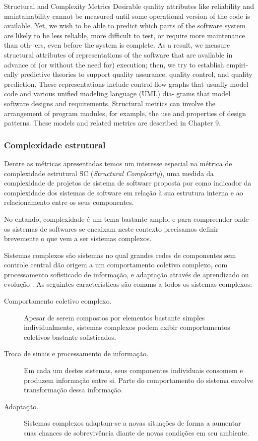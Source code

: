 Structural and Complexity Metrics
Desirable quality attributes like reliability and maintainability cannot be
measured until some operational version of the code is available. Yet, we
wish to be able to predict which parts of the software system are likely to be
less reliable, more difficult to test, or require more maintenance than oth-
ers, even before the system is complete. As a result, we measure structural
attributes of representations of the software that are available in advance
of (or without the need for) execution; then, we try to establish empiri-
cally predictive theories to support quality assurance, quality control, and
quality prediction. These representations include control flow graphs that
usually model code and various unified modeling language (UML) dia-
grams that model software designs and requirements. Structural metrics
can involve the arrangement of program modules, for example, the use
and properties of design patterns. These models and related metrics are
described in Chapter 9.

\subsubsection{Complexidade estrutural} \label{complexidade}

Dentre as métricas apresentadas temos um interesse especial na métrica de
complexidade estrutural SC ({\it Structural Complexity}), uma medida da
complexidade de projetos de sistema de software proposta por
 como indicador da complexidade dos sistemas de software
em relação à sua estrutura interna e ao relacionamento entre os seus
componentes.

No entando, complexidade é um tema bastante amplo, e para compreender onde os
sistemas de softwares se encaixam neste contexto precisamos definir brevemente
o que vem a ser sistemas complexos.

Sistemas complexos são sistemas no qual grandes redes de componentes sem
controle central dão origem a um comportamento
coletivo complexo, com processamento sofisticado de informação, e adaptação
através de aprendizado ou evolução \cite{Mitchell2009}. As seguintes
características são comuns a todos os sistemas complexos:

\begin{description}

  \item[Comportamento coletivo complexo.] Apesar de serem compostos por
  elementos bastante simples individualmente, sistemas complexos podem exibir
  comportamentos coletivos bastante sofisticados.

  \item[Troca de sinais e processamento de informação.] Em cada um destes
  sistemas, seus componentes individuais consomem e produzem informação entre
  si. Parte do comportamento do sistema envolve transformação dessa informação.

  \item[Adaptação.] Sistemas complexos adaptam-se a novas situações de forma a
  aumentar suas chances de sobrevivência diante de novas condições em seu
  ambiente.

\end{description}

